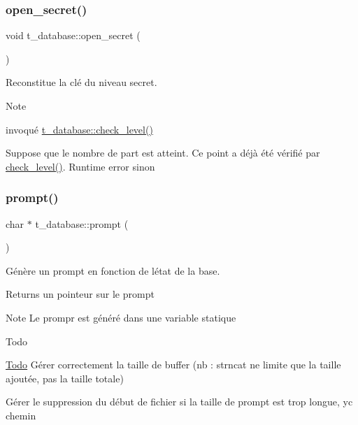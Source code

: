 \subsubsection{\texorpdfstring{open\+\_\+secret()}{open\_secret()}}
{\footnotesize\ttfamily void t\+\_\+database\+::open\+\_\+secret (\begin{DoxyParamCaption}{ }\end{DoxyParamCaption})}



Reconstitue la clé du niveau secret. 

\begin{DoxyNote}{Note}

\begin{DoxyItemize}
\item invoqué \hyperlink{classt__database_aff1abd122b7ea2dedf36eff44d75f0ef}{t\+\_\+database\+::check\+\_\+level()}
\item Suppose que le nombre de part est atteint. Ce point a déjà été vérifié par \hyperlink{classt__database_aff1abd122b7ea2dedf36eff44d75f0ef}{check\+\_\+level()}. Runtime error sinon 
\end{DoxyItemize}
\end{DoxyNote}
\mbox{\label{classt__database_ad8a52cfc74f60fa35aa81078388e3d4f}} 
\subsubsection{\texorpdfstring{prompt()}{prompt()}}
{\footnotesize\ttfamily char $\ast$ t\+\_\+database\+::prompt (\begin{DoxyParamCaption}{ }\end{DoxyParamCaption})}



Génère un prompt en fonction de l\textquotesingle{}état de la base. 

\begin{DoxyReturn}{Returns}
un pointeur sur le prompt 
\end{DoxyReturn}
\begin{DoxyNote}{Note}
Le prompr est généré dans une variable statique 
\end{DoxyNote}
\begin{DoxyRefDesc}{Todo}
\item[\hyperlink{todo__todo000007}{Todo}]Gérer correctement la taille de buffer (nb \+: strncat ne limite que la taille ajoutée, pas la taille totale) 

Gérer le suppression du début de fichier si la taille de prompt est trop longue, yc chemin \end{DoxyRefDesc}
\mbox{\label{classt__database_a63cf67dc2e635cec8d4ec4c023d0350a}} 
